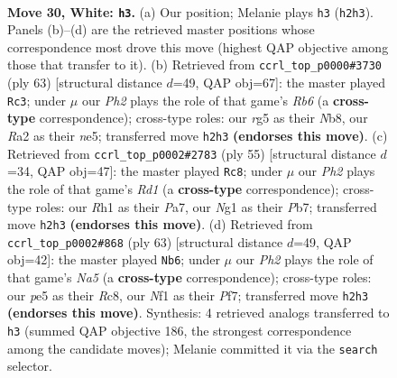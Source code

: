 \documentclass[11pt]{article}
\begin{document}
\clearpage

\begin{figure}[p]\centering
\begin{subfigure}{0.46\textwidth}\centering
\resizebox{\linewidth}{!}{%
\newchessgame
\chessboard[
  setfen={r1b1k3/8/8/1P2ppr1/p1n4p/3p4/R5PP/K4NNR w q - 0 30},
  showmover=false,
  pgfstyle=straightmove, color=movearrow, markmove={h2-h3}
]}
\caption{}
\end{subfigure}\hfill
\begin{subfigure}{0.46\textwidth}\centering
\resizebox{\linewidth}{!}{%
\newchessgame
\chessboard[
  setfen={1n1r2k1/p6p/P7/R3Np2/8/1r1p1P1P/6P1/3R1K2 b - - 3 32},
  showmover=false,
  pgfstyle=straightmove, color=movearrow, markmove={b3-c3}
]}
\caption{}
\end{subfigure}
\\[4pt]
\begin{subfigure}{0.46\textwidth}\centering
\resizebox{\linewidth}{!}{%
\newchessgame
\chessboard[
  setfen={3rn1k1/pp4p1/8/4P1P1/P1Np1r1P/7R/1P6/1K1R4 b - - 0 28},
  showmover=false,
  pgfstyle=straightmove, color=movearrow, markmove={d8-c8}
]}
\caption{}
\end{subfigure}\hfill
\begin{subfigure}{0.46\textwidth}\centering
\resizebox{\linewidth}{!}{%
\newchessgame
\chessboard[
  setfen={2rr2k1/5pp1/6p1/pPp5/n2P3P/5P2/2R3P1/B2R2K1 b - - 2 32},
  showmover=false,
  pgfstyle=straightmove, color=movearrow, markmove={a4-b6}
]}
\caption{}
\end{subfigure}
\caption{\textbf{Move 30, White: \texttt{h3}.} (a) Our position; Melanie plays \texttt{h3} (\texttt{h2h3}). Panels (b)--(d) are the retrieved master positions whose correspondence most drove this move (highest QAP objective among those that transfer to it). (b) Retrieved from \texttt{ccrl\_top\_p0000\#3730} (ply 63) [structural distance $d$=49, QAP obj=67]: the master played \texttt{Rc3}; under $\mu$ our \emph{Ph2} plays the role of that game's \emph{Rb6} (a \textbf{cross-type} correspondence); cross-type roles: our \emph{r}g5 as their \emph{N}b8, our \emph{R}a2 as their \emph{n}e5; transferred move \texttt{h2h3} \textbf{(endorses this move)}. (c) Retrieved from \texttt{ccrl\_top\_p0002\#2783} (ply 55) [structural distance $d$=34, QAP obj=47]: the master played \texttt{Rc8}; under $\mu$ our \emph{Ph2} plays the role of that game's \emph{Rd1} (a \textbf{cross-type} correspondence); cross-type roles: our \emph{R}h1 as their \emph{P}a7, our \emph{N}g1 as their \emph{P}b7; transferred move \texttt{h2h3} \textbf{(endorses this move)}. (d) Retrieved from \texttt{ccrl\_top\_p0002\#868} (ply 63) [structural distance $d$=49, QAP obj=42]: the master played \texttt{Nb6}; under $\mu$ our \emph{Ph2} plays the role of that game's \emph{Na5} (a \textbf{cross-type} correspondence); cross-type roles: our \emph{p}e5 as their \emph{R}c8, our \emph{N}f1 as their \emph{P}f7; transferred move \texttt{h2h3} \textbf{(endorses this move)}. Synthesis: 4 retrieved analogs transferred to \texttt{h3} (summed QAP objective 186, the strongest correspondence among the candidate moves); Melanie committed it via the \texttt{search} selector.}
\label{fig:thought-m58}
\end{figure}
\end{document}
